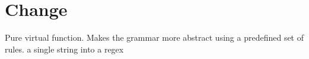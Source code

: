 \hypertarget{Change-example}{}\section{Change}
Pure virtual function. Makes the grammar more abstract using a predefined set of rules. a single string into a regex


\begin{DoxyCodeInclude}{0}
\end{DoxyCodeInclude}
 